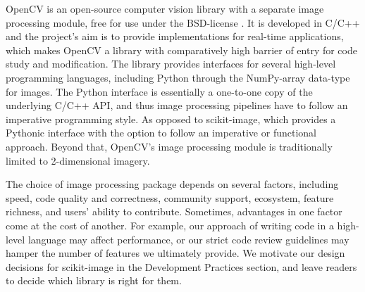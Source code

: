   OpenCV is an open-source computer vision library with a separate image
  processing module, free for use under the BSD-license \citep{opencv}. It is
  developed in C/C++ and the project's aim is to provide implementations for
  real-time applications, which makes OpenCV a library with comparatively high
  barrier of entry for code study and modification. The library provides
  interfaces for several high-level programming languages, including Python
  through the NumPy-array data-type for images. The Python interface is
  essentially a one-to-one copy of the underlying C/C++ API, and thus image
  processing pipelines have to follow an imperative programming style. As
  opposed to scikit-image, which provides a Pythonic interface with the option
  to follow an imperative or functional approach. Beyond that, OpenCV's image
  processing module is traditionally limited to 2-dimensional imagery.

  The choice of image processing package depends on several factors, including
  speed, code quality and correctness, community support, ecosystem, feature
  richness, and users' ability to contribute. Sometimes, advantages in one
  factor come at the cost of another. For example, our approach of writing code
  in a high-level language may affect performance, or our strict code review
  guidelines may hamper the number of features we ultimately provide. We
  motivate our design decisions for scikit-image in the Development Practices
  section, and leave readers to decide which library is right for them.
